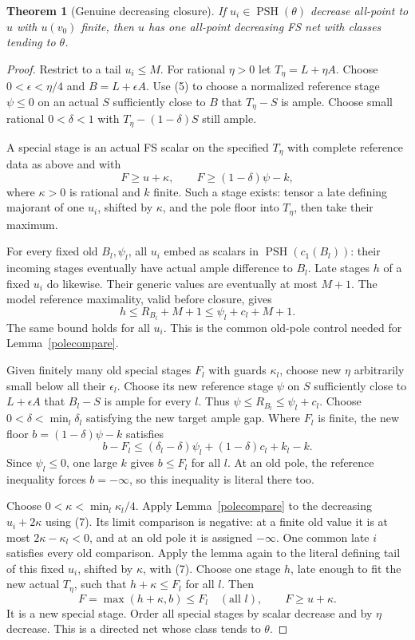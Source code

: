 \documentclass[10pt]{article}
\newtheorem{theorem}{Theorem}[section]
\newcommand{\PSH}{\operatorname{PSH}}
\begin{document}
\begin{theorem}[Genuine decreasing closure]\label{closure}
If $u_i\in\PSH(\theta)$ decrease all-point to $u$ with $u(v_0)$
finite, then $u$ has one all-point decreasing FS net with classes
tending to $\theta$.
\end{theorem}
\begin{proof}
Restrict to a tail $u_i\leq M$. For rational $\eta>0$ let
$T_\eta=L+\eta A$. Choose $0<\epsilon<\eta/4$ and
$B=L+\epsilon A$. Use (5) to choose a normalized reference stage
$\psi\leq0$ on an actual $S$ sufficiently close to $B$ that
$T_\eta-S$ is ample. Choose small rational $0<\delta<1$ with
$T_\eta-(1-\delta)S$ still ample.

A special stage is an actual FS scalar on the specified $T_\eta$
with complete reference data as above and with
\[
 F\geq u+\kappa,\qquad F\geq(1-\delta)\psi-k,
 \tag{6}
\]
where $\kappa>0$ is rational and $k$ finite. Such a stage exists:
tensor a late defining majorant of one $u_i$, shifted by $\kappa$,
and the pole floor into $T_\eta$, then take their maximum.

For every fixed old $B_l,\psi_l$, all $u_i$ embed as scalars in
$\PSH(c_1(B_l))$: their incoming stages eventually have actual ample
difference to $B_l$. Late stages $h$ of a fixed $u_i$ do likewise.
Their generic values are eventually at most $M+1$. The model
reference maximality, valid before closure, gives
\[
 h\leq R_{B_l}+M+1\leq\psi_l+c_l+M+1.                    \tag{7}
\]
The same bound holds for all $u_i$. This is the common old-pole
control needed for Lemma~\ref{polecompare}.

Given finitely many old special stages $F_l$ with guards $\kappa_l$,
choose new $\eta$ arbitrarily small below all their $\epsilon_l$.
Choose its new reference stage $\psi$ on $S$ sufficiently close to
$L+\epsilon A$ that $B_l-S$ is ample for every $l$. Thus
$\psi\leq R_{B_l}\leq\psi_l+c_l$. Choose
$0<\delta<\min_l\delta_l$ satisfying the new target ample gap.
Where $F_l$ is finite, the new floor $b=(1-\delta)\psi-k$ satisfies
\[
 b-F_l\leq(\delta_l-\delta)\psi_l+(1-\delta)c_l+k_l-k.
\]
Since $\psi_l\leq0$, one large $k$ gives $b\leq F_l$ for all $l$.
At an old pole, the reference inequality forces $b=-\infty$, so
this inequality is literal there too.

Choose $0<\kappa<\min_l\kappa_l/4$. Apply
Lemma~\ref{polecompare} to the decreasing $u_i+2\kappa$ using (7).
Its limit comparison is negative: at a finite old value it is at
most $2\kappa-\kappa_l<0$, and at an old pole it is assigned
$-\infty$. One common late $i$ satisfies every old comparison.
Apply the lemma again to the literal defining tail of this fixed
$u_i$, shifted by $\kappa$, with (7). Choose one stage $h$, late
enough to fit the new actual $T_\eta$, such that
$h+\kappa\leq F_l$ for all $l$. Then
\[
 F=\max(h+\kappa,b)\leq F_l\quad(\text{all }l),
 \qquad F\geq u+\kappa.
\]
It is a new special stage. Order all special stages by scalar
decrease and by $\eta$ decrease. This is a directed net whose class
tends to $\theta$.


\end{proof}
\end{document}
